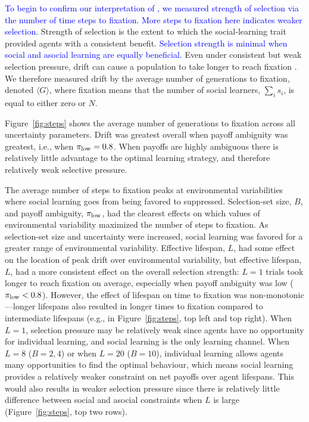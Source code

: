 \documentclass[letterpaper,11.5pt]{scrartcl}
\newcommand{\edit}[1]{{\textcolor{blue} {#1}}}
\begin{document}
\edit{To begin to confirm our interpretation of , we measured strength of selection via the number of
time steps to fixation. More steps to fixation here indicates weaker selection.} Strength of selection is the extent to which the
social-learning trait provided agents with a consistent benefit. \edit{Selection
  strength is minimal when social and asocial learning
are equally beneficial.} Even under consistent but weak selection pressure, drift can cause a population to take longer to reach fixation \citep{plutynski2007drift}. We therefore measured drift by the average number of generations to fixation, denoted $\langle G \rangle$, where fixation means that the number of social learners, $\sum_i s_i$, is equal to either zero or $N$. %

Figure~\ref{fig:steps} shows the average number of generations to fixation across all uncertainty parameters. Drift was greatest overall when payoff ambiguity was greatest, i.e., when $\pi_{\mathrm{low}} = 0.8$. When payoffs are highly ambiguous there is relatively little advantage to the optimal learning strategy, and therefore relatively weak selective pressure.

The average number of steps to fixation peaks at environmental variabilities 
where social learning goes from being favored to suppressed. 
Selection-set size, $B$, 
and payoff ambiguity, $\pi_{\mathrm{low}}$, 
had the clearest effects on which values of environmental variability maximized
the number of steps to fixation. As selection-set size and uncertainty were increased, 
social learning was favored for a greater range of environmental variability. 
Effective lifespan, $L$, 
had some effect on the location of peak
drift over environmental variability, but effective lifespan, $L$, had a more consistent effect on the
overall selection strength: $L=1$ trials took longer to reach fixation on average, 
especially when payoff ambiguity 
was low ($\pi_{\mathrm{low}} < 0.8$). However, the effect of lifespan on time to fixation was non-monotonic---longer
lifespans also resulted in longer times to fixation compared to intermediate lifespans (e.g., in
Figure~\ref{fig:steps}, top left and top right). When $L=1$, selection pressure may be relatively
weak since agents have no opportunity for individual learning, and social learning is the only
learning channel. When $L=8$ ($B=2,4$) or when $L=20$ ($B=10$), individual learning allows agents
many opportunities to find the optimal behaviour, which means social learning provides a relatively
weaker constraint on net payoffs over agent lifespans. This would also results in weaker selection pressure since there is relatively little difference between social and asocial constraints when $L$ is large
(Figure~\ref{fig:steps}, top two rows).
\end{document}
